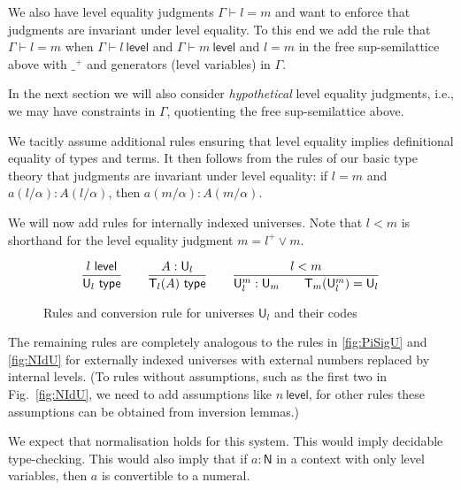 \documentclass[11pt,a4paper]{article}
\theoremstyle{definition}
\newcommand{\NN}{\mathsf{N}}
\newcommand{\UU}{\mathsf{U}}
\newcommand{\Level}{\mathsf{level}}
\newcommand{\type}{\mathsf{type}}
\newcommand{\T}{\mathsf{T}}
\newcommand{\ua}{\mathsf{ua}}
\newcommand{\UA}{\mathsf{UA}}
\begin{document}
We also have level equality judgments $\Gamma\vdash l = m$
and want to enforce that judgments are invariant under level equality.
To this end we add the rule that $\Gamma\vdash l = m$
when $\Gamma\vdash l~\Level$ and $\Gamma\vdash m~\Level$ and
$l=m$ in the free sup-semilattice above with $\_^+$ and generators
(level variables) in $\Gamma$.

In the next section we will also consider \emph{hypothetical} level
equality judgments, i.e., we may have constraints in $\Gamma$,
quotienting the free sup-semilattice above.

We tacitly assume additional %
rules ensuring that level equality
implies definitional equality of types and terms.
It then follows from the rules of our basic type theory that
judgments are invariant under level equality: if $l=m$ and
${a(l/\alpha) : A(l/\alpha)}$, then ${a(m/\alpha) : A(m/\alpha)}$.

We will now add rules for internally indexed universes.
Note that $l<m$ is shorthand for the level equality judgment
$m= l^+ \vee m$.
\begin{figure}[H]
  \caption{Rules and conversion rule for universes $\UU_l$ and their codes}\label{fig:typeUl}
$$
\frac{l~\Level}{\UU_l~\type}~~~~~~
\frac{A:\UU_{l}}{\T_{l}(A)~\type}~~~~~~
\frac{l<m}{\UU^{m}_{l}:\UU_{m}~~~~~~\T_{m}({\UU^{m}_{l}}) = \UU_{l}}
\belowdisplayshortskip 0pt
$$
\end{figure}

The remaining rules are completely analogous to the rules in
\cref{fig:PiSigU} and \cref{fig:NIdU}
for externally indexed universes with external numbers replaced
by internal levels. (To rules without assumptions, such as the first two
in Fig.~\ref{fig:NIdU}, we need to add assumptions like $n~\Level$,
for other rules these assumptions can be obtained from inversion lemmas.)

 We expect that normalisation holds for this system.
 This would imply decidable type-checking.
 This would also imply that if $a : \NN$ in a context with only
 level variables, then $a$ is convertible to a numeral.

\end{document}
